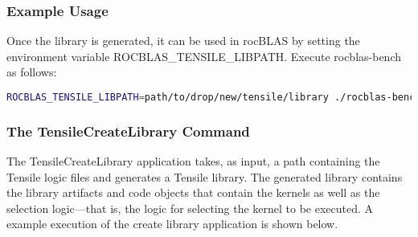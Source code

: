 \documentclass[]{article}
\begin{document}
\subsubsection{Example Usage}

Once the library is generated, it can be used in rocBLAS by setting the environment variable ROCBLAS\_TENSILE\_LIBPATH. Execute rocblas-bench as follows:

\begin{lstlisting}[language=bash]
ROCBLAS_TENSILE_LIBPATH=path/to/drop/new/tensile/library ./rocblas-bench --yaml problem_sizes.yaml
\end{lstlisting}

\subsubsection{The TensileCreateLibrary Command}
The TensileCreateLibrary application takes, as input, a path containing the Tensile logic files and generates a Tensile library. The generated library contains the library artifacts and code objects that contain the kernels as well as the selection logic---that is, the logic for selecting the kernel to be executed. A example execution of the create library application is shown below.
\end{document}
